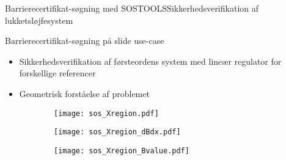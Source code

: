 \begin{frame}{Barrierecertifikat-søgning med SOSTOOLS}{Sikkerhedsverifikation af lukketsløjfesystem}
\begin{block}{Barrierecertifikat-søgning på slide use-case}
		\begin{itemize}
			\item Sikkerhedsverifikation af førsteordens system med lineær regulator for forskellige referencer
			\item Geometrisk forståelse af problemet
		\end{itemize}
\end{block}
\begin{figure}[h]
\begin{subfigure}[h]{.3\textwidth}
	\centering
	\texttt{[image: sos\_Xregion.pdf]}
\end{subfigure}
	\hspace{3mm}
\begin{subfigure}[h]{.3\textwidth}
	\centering
	\texttt{[image: sos\_Xregion\_dBdx.pdf]}
\end{subfigure}
	\hspace{3mm}
\begin{subfigure}[h]{.3\textwidth}
	\centering
	\texttt{[image: sos\_Xregion\_Bvalue.pdf]}
\end{subfigure}
\end{figure}
\end{frame}

